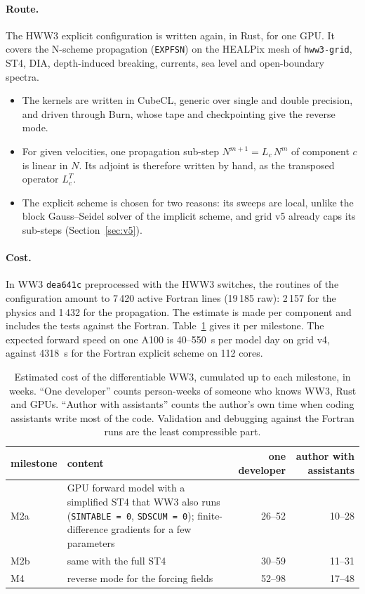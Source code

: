 \documentclass[11pt,a4paper]{article}
\begin{document}
\paragraph{Route.} The HWW3 explicit configuration is written again, in
Rust, for one GPU. It covers the N-scheme propagation (\texttt{EXPFSN}) on
the HEALPix mesh of \texttt{hww3-grid}, ST4, DIA, depth-induced breaking,
currents, sea level and open-boundary spectra.
\begin{itemize}
\item The kernels are written in CubeCL, generic over single and double
precision, and driven through Burn, whose tape and checkpointing give the
reverse mode.
\item For given velocities, one propagation sub-step
$N^{m+1}=L_c\,N^m$ of component $c$ is linear in $N$. Its adjoint is
therefore written by hand, as the transposed operator $L_c^T$.
\item The explicit scheme is chosen for two reasons: its sweeps are local,
unlike the block Gauss--Seidel solver of the implicit scheme, and grid v5
already caps its sub-steps (Section~\ref{sec:v5}).
\end{itemize}

\paragraph{Cost.} In WW3 \texttt{dea641c} preprocessed with the HWW3
switches, the routines of the configuration amount to 7\,420 active Fortran
lines (19\,185 raw): 2\,157 for the physics and 1\,432 for the propagation.
The estimate is made per component and includes the tests against the
Fortran. Table~\ref{tab:diffcost} gives it per milestone. The expected
forward speed on one A100 is 40--\SI{550}{s} per model day on grid v4,
against \SI{4318}{s} for the Fortran explicit scheme on 112 cores.

\begin{table}[H]
\centering\small
\begin{tabular}{lp{6.2cm}rr}
\toprule
milestone & content & one developer & author with assistants \\
\midrule
M2a & GPU forward model with a simplified ST4 that WW3 also runs
(\texttt{SINTABLE = 0}, \texttt{SDSCUM = 0}); finite-difference gradients
for a few parameters & 26--52 & 10--28 \\
M2b & same with the full ST4 & 30--59 & 11--31 \\
M4 & reverse mode for the forcing fields & 52--98 & 17--48 \\
\bottomrule
\end{tabular}
\caption{Estimated cost of the differentiable WW3, cumulated up to each
milestone, in weeks. ``One developer'' counts person-weeks of someone who
knows WW3, Rust and GPUs. ``Author with assistants'' counts the author's
own time when coding assistants write most of the code. Validation and
debugging against the Fortran runs are the least compressible part.}
\label{tab:diffcost}
\end{table}
\end{document}
